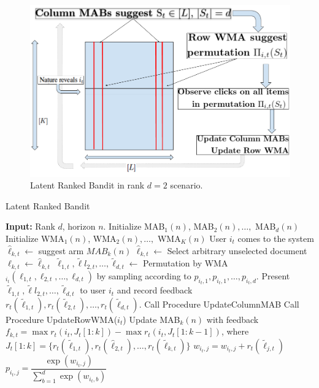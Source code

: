 \begin{figure}[!th]
    \includegraphics[scale=0.2]{img/RankedBand.png}
    \caption{Latent Ranked Bandit in rank $d=2$ scenario.}
    \label{fig:rankedbandit}
    \vspace*{-1em}
\end{figure}

\begin{algorithm}
\caption{Latent Ranked Bandit}
\label{alg:latent-rank}
  \begin{algorithmic}[1]
  \State \textbf{Input:} Rank $d$, horizon $n$.
  \State Initialize MAB$_1(n)$, MAB$_2(n), \dots,$ MAB$_d(n)$
  \State Initialize WMA$_1(n)$, WMA$_2(n), \dots,$ WMA$_K(n)$
      \State User $i_t$ comes to the system
      \State $\hat{\ell}_{k,t} \leftarrow$ suggest arm $MAB_k(n)$
      \State $\hat{\ell}_{k,t} \leftarrow$ Select arbitrary unselected document
      \Else
      \State $\ell_{k,t} \leftarrow \hat{\ell}_{k,t}$
      \EndIf
      \EndFor
      \State $\tilde{\ell}_{1,t},\tilde{\ell}l_{2,t},\dots,\tilde{\ell}_{d,t}\leftarrow$ Permutation by WMA$_{i_t}(\ell_{1,t},\ell_{2,t},\dots,\ell_{d,t})$ by sampling according to $p_{i_t,1},p_{i_t,1},\dots,p_{i_t,d}$.
      \State Present $\tilde{\ell}_{1,t},\tilde{\ell}l_{2,t},\dots,\tilde{\ell}_{d,t}$ to user $i_t$ and record feedback $r_{t}(\tilde{\ell}_{1,t}), r_{t}(\tilde{\ell}_{2,t}),\dots,r_{t}(\tilde{\ell}_{d,t})$.
      \State Call Procedure UpdateColumnMAB
      \State Call Procedure UpdateRowWMA($i_t$)
    \EndFor
    \State Update MAB$_k(n)$ with feedback $f_{k,t} = \max r_t(i_t, J_t[1: k]) - \max r_t(i_t, J_t[1: k - 1])$, where $J_t[1: k] = \lbrace r_{t}(\tilde{\ell}_{1,t}), r_{t}(\hat{\ell}_{2,t}),\dots,r_{t}(\tilde{\ell}_{k,t})\rbrace$
    \EndFor
\EndProcedure
{}
    \State $w_{i_t,j} = w_{i_t,j} + r_{t}(\tilde{\ell}_{j,t})$
    \EndFor
    \State $p_{i_t,j} = \dfrac{\exp(w_{i_t,j})}{\sum_{b=1}^d \exp(w_{i_t,b})} $
    \EndFor
\EndProcedure
  \end{algorithmic}
\end{algorithm}
